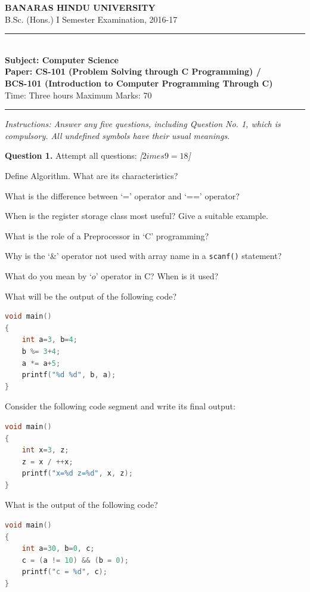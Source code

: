 \documentclass[11pt,a4paper]{article}
\newcommand{\pts}[1]{\hfill   \textit{[#1]}}
\begin{document}
\begin{center}
  {\large\bfseries BANARAS HINDU UNIVERSITY}\\[2pt]
  {\normalsize B.Sc. (Hons.) I Semester Examination, 2016-17}\\[6pt]
  \rule{0.8\linewidth}{0.5pt}\\[6pt]
  {\large\bfseries Subject: Computer Science}\\[4pt]
  {\large\bfseries Paper: CS-101 (Problem Solving through C Programming) /}\\[2pt]
  {\large\bfseries BCS-101 (Introduction to Computer Programming Through C)}\\[4pt]
  {\normalsize Time: Three hours \hfill Maximum Marks: 70}
\end{center}

\rule{\linewidth}{0.4pt}

\smallskip



\noindent   \textit{Instructions: Answer any five questions, including Question No. 1, which is compulsory. All undefined symbols have their usual meanings.}

\bigskip

\medskip


\noindent   \textbf{Question 1.} Attempt all questions: \pts{$2 imes9=18$}

\begin{parts}
  \item Define Algorithm. What are its characteristics?
  \item What is the difference between `=' operator and `==' operator?
  \item When is the register storage class most useful? Give a suitable example.
  \item What is the role of a Preprocessor in `C' programming?
  \item Why is the `\&' operator not used with array name in a   \texttt{scanf()} statement?
  \item What do you mean by `$ o$' operator in C? When is it used?
  \item What will be the output of the following code?

\begin{lstlisting}[language=C]
void main()
{
    int a=3, b=4;
    b %= 3+4;
    a *= a+5;
    printf("%d %d", b, a);
}
\end{lstlisting}
  \item Consider the following code segment and write its final output:

\begin{lstlisting}[language=C]
void main()
{
    int x=3, z;
    z = x / ++x;
    printf("x=%d z=%d", x, z);
}
\end{lstlisting}
  \item What is the output of the following code?

\begin{lstlisting}[language=C]
void main()
{
    int a=30, b=0, c;
    c = (a != 10) && (b = 0);
    printf("c = %d", c);
}
\end{lstlisting}
\end{parts}
\end{document}
